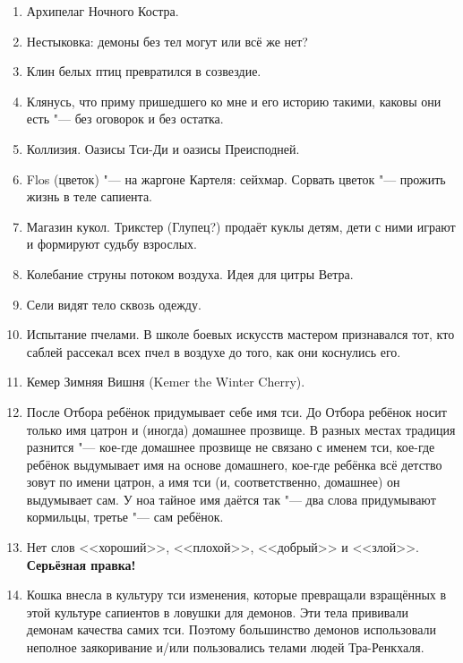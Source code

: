 \begin{enumerate}
\item Архипелаг Ночного Костра.

\item Нестыковка: демоны без тел могут или всё же нет?

\item Клин белых птиц превратился в созвездие.

\item Клянусь, что приму пришедшего ко мне и его историю такими, каковы они есть "--- без оговорок и без остатка.

\item Коллизия. Оазисы Тси-Ди и оазисы Преисподней.

\item Flos (цветок) "--- на жаргоне Картеля: сейхмар.
Сорвать цветок "--- прожить жизнь в теле сапиента.

\item Магазин кукол.
Трикстер (Глупец?) продаёт куклы детям, дети с ними играют и формируют судьбу взрослых.

\item Колебание струны потоком воздуха.
Идея для цитры Ветра.

\item Сели видят тело сквозь одежду.

\item Испытание пчелами.
В школе боевых искусств мастером признавался тот, кто саблей рассекал всех пчел в воздухе до того, как они коснулись его.

\item Кемер Зимняя Вишня (Kemer the Winter Cherry).

\item После Отбора ребёнок придумывает себе имя тси.
До Отбора ребёнок носит только имя цатрон и (иногда) домашнее прозвище.
В разных местах традиция разнится "--- кое-где домашнее прозвище не связано с именем тси, кое-где ребёнок выдумывает имя на основе домашнего, кое-где ребёнка всё детство зовут по имени цатрон, а имя тси (и, соответственно, домашнее) он выдумывает сам.
У ноа тайное имя даётся так "--- два слова придумывают кормильцы, третье "--- сам ребёнок.

\item Нет слов <<хороший>>, <<плохой>>, <<добрый>> и <<злой>>.
\textbf{Серьёзная правка!}

\item Кошка внесла в культуру тси изменения, которые превращали взращённых в этой культуре сапиентов в ловушки для демонов.
Эти тела прививали демонам качества самих тси.
Поэтому большинство демонов использовали неполное заякоривание и/или пользовались телами людей Тра-Ренкхаля.


\end{enumerate}
